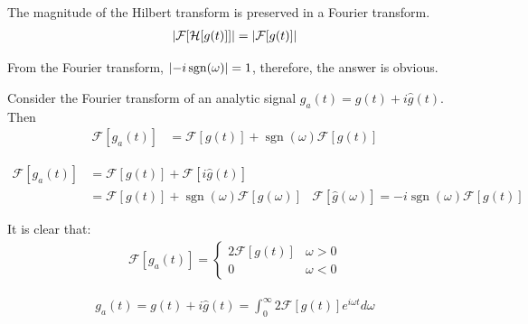 \documentclass[12pt, english]{book}
\makeatletter
\renewenvironment{proof}[1][\proofname]{\par
	\pushQED{\qed}%
	\normalfont \topsep6\p@\@plus6\p@\relax
	\list{}{%
		\settowidth{\leftmargin}{\itshape\proofname:\hskip\labelsep}%
		\setlength{\labelwidth}{0pt}%
		\setlength{\itemindent}{-\leftmargin}%
	}%
	\item[\hskip\labelsep\itshape#1\@addpunct{:}]\ignorespaces
	}{ \popQED\endlist\@endpefalse}
\makeatother
\begin{document}
	\begin{lemma}
		The magnitude of the Hilbert transform is preserved in a Fourier transform.
		\begin{align*}
			\abs{\mathcal{F}[\mathcal{H}[g(t)]]} = \abs{\mathcal{F}[g(t)]}
		\end{align*}
	\end{lemma}
	\begin{proof}
		From the Fourier transform, \(\abs{-i \operatorname{sgn}(\omega)} = 1\), therefore, the answer is obvious. 
	\end{proof}
	
	\begin{theorem}
		\label{Fourier Transform af an Analytic Signal Theorem - Complex}
		Consider the Fourier transform of an analytic signal \(g_a(t) = g(t) + i \hat{g}(t)\). Then
		\begin{align*}
			\mathcal{F}[g_a(t)] 
			&= \mathcal{F}[g(t)] + \operatorname{sgn}(\omega)\mathcal{F}[g(t)] 
		\end{align*}
	\end{theorem}
	\begin{proof}
		\begin{align*}
			\mathcal{F}[g_a(t)] 
			&= \mathcal{F}[g(t)] + \mathcal{F}[i\hat{g}(t)] \\
			&= \mathcal{F}[g(t)] + \operatorname{sgn}(\omega) \mathcal{F}[g(\omega)]
				& \mathcal{F}[\hat{g}(\omega)] = -i \operatorname{sgn}(\omega) \mathcal{F}[g(t)] 
		\end{align*}
	\end{proof}
	
	It is clear that:
	\begin{align*}
		\mathcal{F}[g_a(t)] 
		= \begin{cases}
			2 \mathcal{F}[g(t)] & \omega > 0 \\
			0 					& \omega < 0
		\end{cases}
	\end{align*}

	\begin{corollary}
		\begin{align*}
			g_a (t) = g(t) + i \hat{g}(t) = \int_{0}^{\infty} 2 \mathcal{F}[g(t)] e^{i\omega t} d\omega
		\end{align*}
	\end{corollary}
\end{document}
